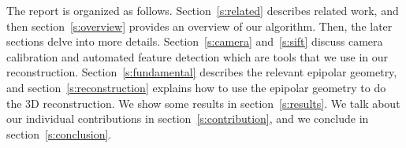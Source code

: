 The report is organized as follows. Section~\ref{s:related} describes related work, and then section~\ref{s:overview} provides an overview of our algorithm. Then, the later sections delve into more details. Section~\ref{s:camera} and~\ref{s:sift} discuss camera calibration and automated feature detection which are tools that we use in our reconstruction. Section~\ref{s:fundamental} describes the relevant epipolar geometry, and section~\ref{s:reconstruction} explains how to use the epipolar geometry to do the 3D reconstruction. We show some results in section~\ref{s:results}. We talk about our individual contributions in section~\ref{s:contribution}, and we conclude in section~\ref{s:conclusion}.
